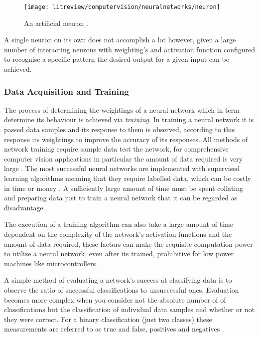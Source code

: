 \begin{figure}[h]
    \centering
    \texttt{[image: litreview/computervision/neuralnetworks/neuron]}
    \caption{An artificial neuron \cite{ann_handbook}.}
    \label{fig:neuron}
\end{figure}

A single neuron on its own does not accomplish a lot however, given a large number of interacting neurons with weighting's and activation function configured to recognise a specific pattern the desired output for a given input can be achieved.

\subsubsection{Data Acquisition and Training}

The process of determining the weightings of a neural network which in term determine its behaviour is achieved via \emph{training}. In training a neural network it is passed data samples and its response to them is observed, according to this response its weightings to improve the accuracy of its responses. All methods of network training require sample data test the network, for comprehensive computer vision applications in particular the amount of data required is very large \cite{large_data_neural_network}. The most successful neural networks are implemented with supervised learning algorithms meaning that they require labelled data, which can be costly in time or money \cite{patterns_machine_learning} \cite{supervised_neural_networks}. A sufficiently large amount of time must be spent collating and preparing data just to train a neural network \cite{data_labelling} that it can be regarded as disadvantage.

The execution of a training algorithm can also take a large amount of time dependent on the complexity of the network's activation functions and the amount of data required, these factors can make the requisite computation power to utilize a neural network, even after its trained, prohibitive for low power machines like microcontrollers \cite{computations_neural_network}. 

A simple method of evaluating a network's success at classifying data is to observe the ratio of successful classifications to unsuccessful ones. Evaluation becomes more complex when you consider not the absolute number of of classifications but the classification of individual data samples and whether or not they were correct. For a binary classification (just two classes) these measurements are referred to as true and false, positives and negatives \cite{neural_networks}. 

